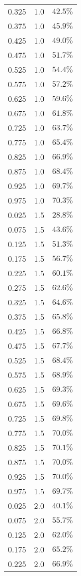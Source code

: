 \begin{longtable}{rrr}
0.325 & 1.0 & $42.5\%$ \\ 
0.375 & 1.0 & $45.9\%$ \\ 
0.425 & 1.0 & $49.0\%$ \\ 
0.475 & 1.0 & $51.7\%$ \\ 
0.525 & 1.0 & $54.4\%$ \\ 
0.575 & 1.0 & $57.2\%$ \\ 
0.625 & 1.0 & $59.6\%$ \\ 
0.675 & 1.0 & $61.8\%$ \\ 
0.725 & 1.0 & $63.7\%$ \\ 
0.775 & 1.0 & $65.4\%$ \\ 
0.825 & 1.0 & $66.9\%$ \\ 
0.875 & 1.0 & $68.4\%$ \\ 
0.925 & 1.0 & $69.7\%$ \\ 
0.975 & 1.0 & $70.3\%$ \\ 
0.025 & 1.5 & $28.8\%$ \\ 
0.075 & 1.5 & $43.6\%$ \\ 
0.125 & 1.5 & $51.3\%$ \\ 
0.175 & 1.5 & $56.7\%$ \\ 
0.225 & 1.5 & $60.1\%$ \\ 
0.275 & 1.5 & $62.6\%$ \\ 
0.325 & 1.5 & $64.6\%$ \\ 
0.375 & 1.5 & $65.8\%$ \\ 
0.425 & 1.5 & $66.8\%$ \\ 
0.475 & 1.5 & $67.7\%$ \\ 
0.525 & 1.5 & $68.4\%$ \\ 
0.575 & 1.5 & $68.9\%$ \\ 
0.625 & 1.5 & $69.3\%$ \\ 
0.675 & 1.5 & $69.6\%$ \\ 
0.725 & 1.5 & $69.8\%$ \\ 
0.775 & 1.5 & $70.0\%$ \\ 
0.825 & 1.5 & $70.1\%$ \\ 
0.875 & 1.5 & $70.0\%$ \\ 
0.925 & 1.5 & $70.0\%$ \\ 
0.975 & 1.5 & $69.7\%$ \\ 
0.025 & 2.0 & $40.1\%$ \\ 
0.075 & 2.0 & $55.7\%$ \\ 
0.125 & 2.0 & $62.0\%$ \\ 
0.175 & 2.0 & $65.2\%$ \\ 
0.225 & 2.0 & $66.9\%$ \\ 

\end{longtable}
